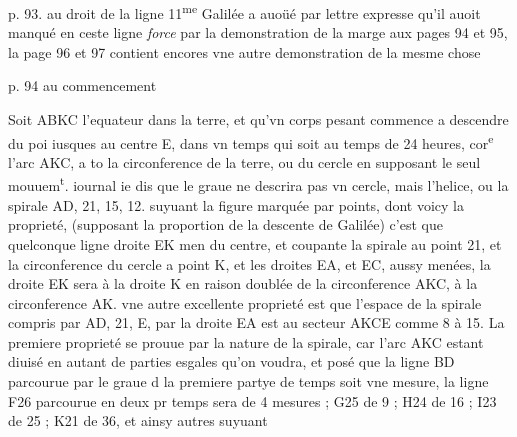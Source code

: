 \documentclass[11pt,a4paper]{article}
\begin{document}
p. 93. au droit de la ligne  11\textsuperscript{me}
Galilée a  auoüé par lettre expresse qu'il auoit manqué en ceste ligne \emph{force} par la demonstration de la marge aux pages 94 et 95, la page 96 et 97 contient encores vne autre demonstration de la mesme chose

p. 94 au commencement

Soit ABKC l'equateur dans la terre, et qu'vn corps pesant commence a descendre du poi \ill{} iusques au centre E, dans vn temps qui soit au temps de 24 heures, cor\textsuperscript{e} l'arc AKC, a to la circonference de la terre, ou du cercle en supposant le seul mouuem\textsuperscript{t}. iournal ie dis que le graue ne descrira pas vn cercle, mais l'helice, ou la spirale AD, 21, \ill{} 15, 12. suyuant la figure marquée par points, dont voicy la proprieté, (supposant la proportion de la descente de Galilée) c'est que quelconque ligne droite EK men du centre, et coupante la spirale au point 21, et la circonference du cercle a point K, et les droites EA, et EC, aussy menées, la droite EK sera à la droite K\ill{} en raison doublée de la circonference AKC, à la circonference AK. vne autre excellente proprieté est que l'espace de la spirale compris par AD, 21, E, \ill{} par la droite EA est au secteur AKCE comme 8 à 15. La premiere proprieté se prouue par la nature de la spirale, car l'arc AKC estant diuisé en autant de parties esgales qu'on voudra, et posé que la ligne BD parcourue par le graue d\ill{} la premiere partye de temps soit vne mesure, la ligne F26 parcourue en deux pr\ill{} temps sera de 4 mesures ; G25 de 9 ; H24 de 16 ; I23 de 25 ; K21 de 36, et ainsy \ill{}
autres suyuant
\end{document}
